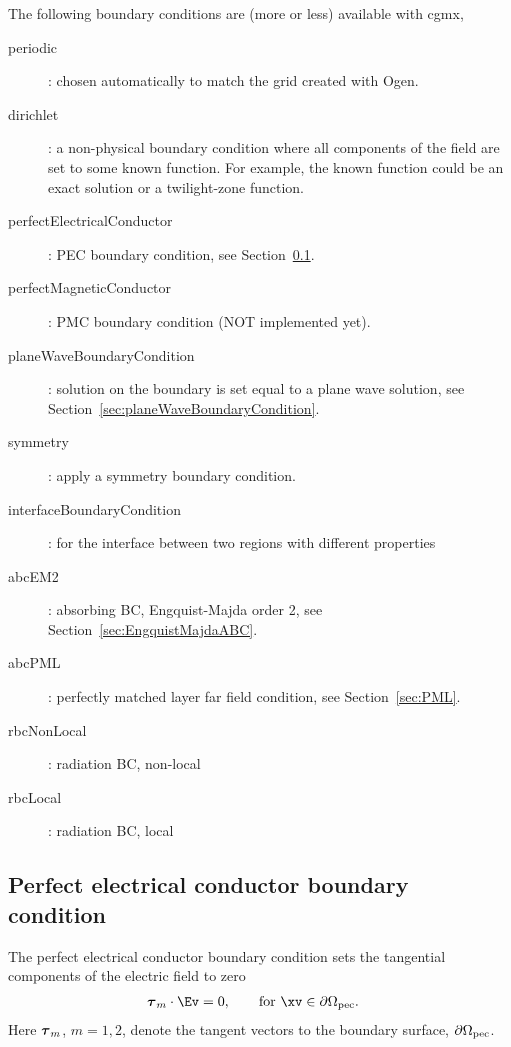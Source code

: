 \documentclass{article}
\begin{document}
\noindent The following boundary conditions are (more or less) available with cgmx,
\begin{description}
  \item[periodic]: chosen automatically to match the grid created with Ogen.
  \item[dirichlet]: a non-physical boundary condition where all components of the field are set to some known function.
                    For example, the known function could be an exact solution or a twilight-zone function.
  \item[perfectElectricalConductor]: PEC boundary condition, see Section~\ref{sec:perfectElectricalConductor}.
  \item[perfectMagneticConductor]: PMC boundary condition (NOT implemented yet).
  \item[planeWaveBoundaryCondition]: solution on the boundary is set equal to a plane wave solution, see Section~\ref{sec:planeWaveBoundaryCondition}. 
  \item[symmetry]: apply a symmetry boundary condition. 
  \item[interfaceBoundaryCondition]: for the interface between two regions with different properties
  \item[abcEM2]: absorbing BC, Engquist-Majda order 2, see Section~\ref{sec:EngquistMajdaABC}.
  \item[abcPML]: perfectly matched layer far field condition, see Section~\ref{sec:PML}.
  \item[rbcNonLocal]: radiation BC, non-local
  \item[rbcLocal]: radiation BC, local
\end{description}


\subsection{Perfect electrical conductor boundary condition}\label{sec:perfectElectricalConductor}

The perfect electrical conductor boundary condition sets the tangential components of the
electric field to zero
\begin{align}
   \tauv_m\cdot\Ev &= 0, \qquad \text{for $\xv \in \partial\Omega_{\rm pec}$}. 
\end{align}
Here $\boldsymbol{\tau}_m$, $m=1,2$, denote the tangent vectors to the boundary surface, $\partial\Omega_{\rm pec}$.
\end{document}
